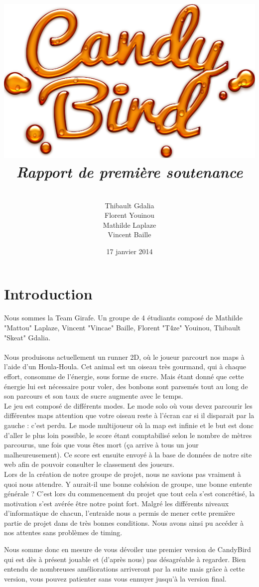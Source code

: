 \documentclass [11pt]{report}
\title{
	\includegraphics[scale=0.43]{images/Logojeu.png}
	 \\\vspace{20mm}
	\textbf{\Huge \itshape Rapport de premi\`ere soutenance  }
	}
\author{ \\\vspace{2mm}
	Thibault Gdalia\\\vspace{2mm}
	Florent Youinou\\\vspace{2mm}
	Mathilde Laplaze\\\vspace{2mm}
	Vincent Baille \\\vspace{30mm}
	}
\date{17 janvier 2014}
\begin{document}
\thispagestyle{fancy}
\renewcommand{\baselinestretch}{0.001}
\maketitle
\tableofcontents

\newpage



\chapter*{Introduction}

\indent Nous sommes la Team Girafe. Un groupe de 4 étudiants composé de Mathilde "Mattou" Laplaze, Vincent "Vincae" Baille, Florent "T4ze" Youinou, Thibault "Skeat" Gdalia. \\\\
\indent Nous produisons actuellement un runner 2D, où le joueur parcourt nos maps à l'aide d'un Houla-Houla. Cet animal est un oiseau très gourmand, qui à chaque effort, consomme de l'énergie, sous forme de sucre. Mais étant donné que cette énergie lui est nécessaire pour voler, des bonbons sont parsemés tout au long de son parcours et son taux de sucre augmente avec le temps.\\
\indent Le jeu est composé de différents modes. Le mode solo où vous devez parcourir les différentes maps attention que votre oiseau reste à l'écran car si il disparait par la gauche : c'est perdu. Le mode multijoueur où la map est infinie et le but est donc d'aller le plus loin possible, le score étant comptabilisé selon le nombre de mètres parcourus, une fois que vous êtes mort (ça arrive à tous un jour malheureusement). Ce score est ensuite envoyé à la base de données de notre site web afin de pouvoir consulter le classement des joueurs.\\

Lors de la création de notre groupe de projet, nous ne savions pas vraiment à quoi nous attendre. Y aurait-il une bonne cohésion de groupe, une bonne entente générale ? C'est lors du commencement du projet que tout cela s'est concrétisé, la motivation s'est avérée être notre point fort. Malgré les différents niveaux d'informatique de chacun, l'entraide nous a permis de mener cette première partie de projet dans de très bonnes conditions. Nous avons ainsi pu accéder à nos attentes sans problèmes de timing.

Nous somme donc en mesure de vous dévoiler une premier version de CandyBird qui est dès à présent jouable et (d'après nous) pas désagréable à regarder. Bien entendu de nombreuses améliorations arriveront par la suite mais grâce à cette version, vous pouvez patienter sans vous ennuyer jusqu'à la version final.\\
\end{document}
